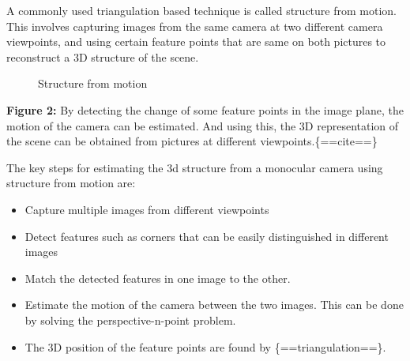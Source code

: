 A commonly used triangulation based technique is called structure from
motion. This involves capturing images from the same camera at two
different camera viewpoints, and using certain feature points that are
same on both pictures to reconstruct a 3D structure of the scene.

\begin{figure}
\centering
{}
\caption{Structure from motion}
\end{figure}

\textbf{Figure 2:} By detecting the change of some feature points in the
image plane, the motion of the camera can be estimated. And using this,
the 3D representation of the scene can be obtained from pictures at
different viewpoints.\{==cite==\}

The key steps for estimating the 3d structure from a monocular camera
using structure from motion are:

\begin{itemize}
\tightlist
\item
  Capture multiple images from different viewpoints
\item
  Detect features such as corners that can be easily distinguished in
  different images
\item
  Match the detected features in one image to the other.
\item
  Estimate the motion of the camera between the two images. This can be
  done by solving the perspective-n-point problem.
\item
  The 3D position of the feature points are found by
  \{==triangulation==\}.
\end{itemize}

